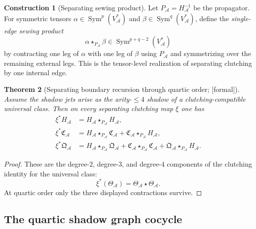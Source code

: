 \documentclass[11pt,oneside]{memoir}
\numberwithin{equation}{chapter}
\newtheorem{theorem}{Theorem}[chapter]
\theoremstyle{definition}
\newtheorem{construction}[theorem]{Construction}
\newcommand{\ClaimStatusProvedHere}{\textnormal{[formal]}}
\newcommand{\cA}{\mathcal A}
\begin{document}
\begin{construction}[Separating sewing product]
\label{constr:nms-sewing-product}
Let $P_{\cA}=H_{\cA}^{-1}$ be the propagator.  For symmetric tensors $\alpha\in \operatorname{Sym}^p(V_{\cA}^*)$ and $\beta\in \operatorname{Sym}^q(V_{\cA}^*)$, define the \emph{single-edge sewing product}
\[
\alpha\star_{P_{\cA}}\beta\in \operatorname{Sym}^{p+q-2}(V_{\cA}^*)
\]
by contracting one leg of $\alpha$ with one leg of $\beta$ using $P_{\cA}$ and symmetrizing over the remaining external legs.  This is the tensor-level realization of separating clutching by one internal edge.
\end{construction}

\begin{theorem}[Separating boundary recursion through quartic order; \ClaimStatusProvedHere]
\label{thm:nms-separating-boundary-recursion}
Assume the shadow jets arise as the arity-$\le 4$ shadow of a clutching-compatible universal class.  Then on every separating clutching map $\xi$ one has
\begin{align}
\xi^*H_{\cA}
&=
H_{\cA}\star_{P_{\cA}} H_{\cA},
\label{eq:nms-clutching-H}
\\
\xi^*\mathfrak C_{\cA}
&=
H_{\cA}\star_{P_{\cA}}\mathfrak C_{\cA}
+
\mathfrak C_{\cA}\star_{P_{\cA}} H_{\cA},
\label{eq:nms-clutching-C}
\\
\xi^*\mathfrak Q_{\cA}
&=
H_{\cA}\star_{P_{\cA}}\mathfrak Q_{\cA}
+
\mathfrak C_{\cA}\star_{P_{\cA}}\mathfrak C_{\cA}
+
\mathfrak Q_{\cA}\star_{P_{\cA}}H_{\cA}.
\label{eq:nms-clutching-Q}
\end{align}
\end{theorem}

\begin{proof}
These are the degree-$2$, degree-$3$, and degree-$4$ components of the clutching identity for the universal class:
\[
\xi^*(\Theta_{\cA})=\Theta_{\cA}\star \Theta_{\cA}.
\]
At quartic order only the three displayed contractions survive.\qedhere
\end{proof}

\subsection{The quartic shadow graph cocycle}
\label{subsec:nms-shadow-graph-complex}
\end{document}
